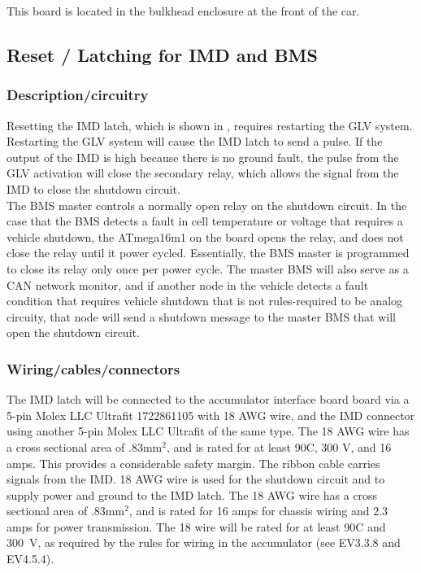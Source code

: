 \documentclass{article}
\begin{document}
This board is located in the bulkhead enclosure at the front of the car.

\subsection{Reset / Latching for IMD and BMS}\label{reset_latching_for_imd_and_bms}
\subsubsection{Description/circuitry}

Resetting the IMD latch, which is shown in  , requires restarting the GLV system. Restarting the GLV system will cause the IMD latch to send a pulse. If the output of the IMD is high because there is no ground fault, the pulse from the GLV activation will close the secondary relay, which allows the signal from the IMD to close the shutdown circuit.\\

The BMS master controls a normally open relay on the shutdown circuit. In the case that the BMS detects a fault in cell temperature or voltage that requires a vehicle shutdown, the ATmega16m1 on the board opens the relay, and does not close the relay until it power cycled. Essentially, the BMS master is programmed to close its relay only once per power cycle. The master BMS will also serve as a CAN network monitor, and if another node in the vehicle detects a fault condition that requires vehicle shutdown that is not rules-required to be analog circuity, that node will send a shutdown message to the master BMS that will open the shutdown circuit. 

\subsubsection{Wiring/cables/connectors}
The IMD latch will be connected to the accumulator interface board board via a 5-pin Molex LLC Ultrafit 1722861105 with 18 AWG wire, and the IMD connector using another 5-pin Molex LLC Ultrafit of the same type. The 18 AWG wire has a cross sectional area of .83mm$^2$, and is rated for at least 90\textdegree C, 300 V, and 16 amps. This provides a considerable safety margin. The ribbon cable carries signals from the IMD. 18 AWG wire is used for the shutdown circuit and to supply power and ground to the IMD latch. The 18 AWG wire has a cross sectional area of .83mm$^2$, and is rated for 16 amps for chassis wiring and 2.3 amps for power transmission. The 18 wire will be rated for at least 90\textdegree C and 300~V, as required by the rules for wiring in the accumulator (see EV3.3.8 and EV4.5.4).\\
\end{document}

